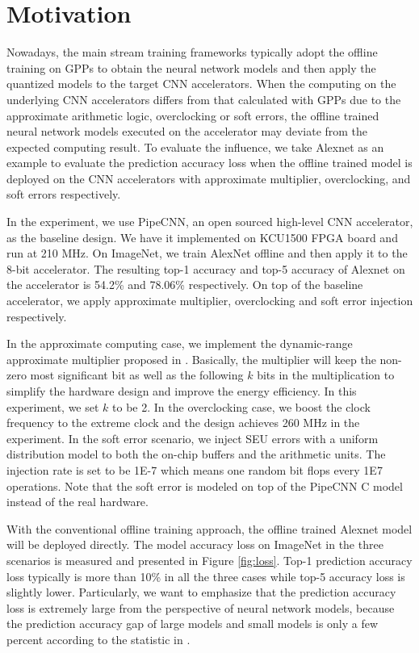 \section{Motivation} \label{sec:motivation}
Nowadays, the main stream training frameworks typically adopt the offline training
on GPPs to obtain the neural network models and then apply the quantized models to the 
target CNN accelerators. When the computing on the underlying CNN accelerators differs
from that calculated with GPPs due to the approximate arithmetic logic, overclocking or 
soft errors, the offline trained neural network models executed on the accelerator 
may deviate from the expected computing result. To evaluate the influence, 
we take Alexnet as an example to evaluate the prediction 
accuracy loss when the offline trained model is deployed on the CNN 
accelerators with approximate multiplier, overclocking, and soft errors respectively. 

In the experiment, we use PipeCNN\cite{pipecnn_2}, an open sourced high-level CNN accelerator, 
as the baseline design. We have it implemented on KCU1500 FPGA board and run at 210 MHz. 
On ImageNet, we train AlexNet offline and then apply it to the 8-bit accelerator. 
The resulting top-1 accuracy and top-5 accuracy of Alexnet on the accelerator 
is 54.2\% and 78.06\% respectively. On top of the baseline accelerator, we apply 
approximate multiplier, overclocking and soft error injection respectively. 

In the approximate computing case, we implement the dynamic-range approximate 
multiplier proposed in \cite{Approximate_Multiplier_31}. Basically, the multiplier 
will keep the non-zero most significant bit as well as the following $k$ bits in the 
multiplication to simplify the hardware design and improve the energy efficiency.
In this experiment, we set $k$ to be 2. In the overclocking case, we boost the clock frequency 
to the extreme clock and the design achieves 260 MHz in the experiment. 
In the soft error scenario, we inject SEU errors with a uniform distribution model to 
both the on-chip buffers and the arithmetic units. The injection rate is set to be 
1E-7 which means one random bit flops every 1E7 operations. Note that the soft error is modeled 
on top of the PipeCNN C model instead of the real hardware.

With the conventional offline training approach, the offline trained Alexnet model 
will be deployed directly. The model accuracy loss on ImageNet in the three scenarios is 
measured and presented in Figure \ref{fig:loss}. Top-1 prediction accuracy loss 
typically is more than 10\% in all the three cases while top-5 accuracy loss is slightly 
lower. Particularly, we want to emphasize that the prediction accuracy loss is extremely large 
from the perspective of neural network models, because the prediction accuracy gap of 
large models and small models is only a few percent according to the statistic in \cite{model-accuracy}.

